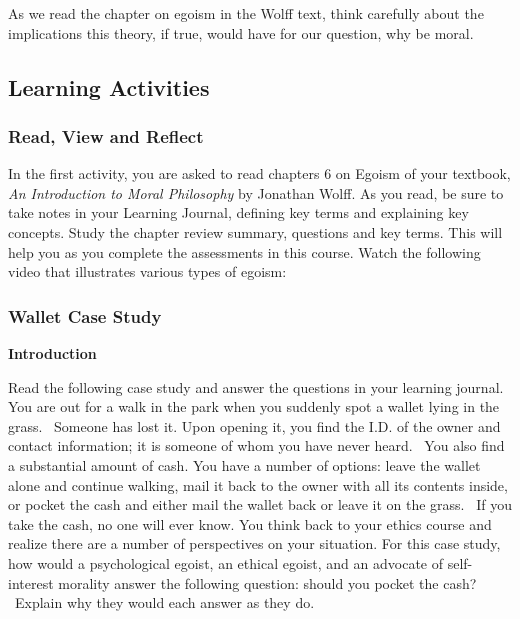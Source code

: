 \documentclass[
]{book}
\begin{document}
As we read the chapter on egoism in the Wolff text, think carefully about the
implications this theory, if true, would have for our question, why be moral.

\hypertarget{learning-activities-6}{%
\subsection*{Learning Activities}\label{learning-activities-6}}

\begin{reflect}
\hypertarget{read-view-and-reflect-8}{%
\subsubsection*{Read, View and Reflect}\label{read-view-and-reflect-8}}

In the first activity, you are asked to read chapters 6 on Egoism of your
textbook, \emph{An Introduction to Moral Philosophy} by Jonathan Wolff. As you read,
be sure to take notes in your Learning Journal, defining key terms and
explaining key concepts. Study the chapter review summary, questions and key
terms. This will help you as you complete the assessments in this course.
Watch the following video that illustrates various types of egoism:

\hypertarget{wallet-case-study-1}{%
\subsubsection*{Wallet Case Study}\label{wallet-case-study-1}}

\textbf{Introduction}

Read the following case study and answer the questions in your learning journal.
You are out for a walk in the park when you suddenly spot a wallet lying in the grass. ~Someone has lost it. Upon opening it, you find the I.D. of the owner and contact information; it is someone of whom you have never heard. ~You also find a substantial amount of cash. You have a number of options: leave the wallet alone and continue walking, mail it back to the owner with all its contents inside, or pocket the cash and either mail the wallet back or leave it on the grass. ~If you take the cash, no one will ever know. You think back to your ethics course and realize there are a number of perspectives on your situation.
For this case study, how would a psychological egoist, an ethical egoist, and an advocate of self-interest morality answer the following question: should you pocket the cash? ~Explain why they would each answer as they do.
\end{reflect}
\end{document}
